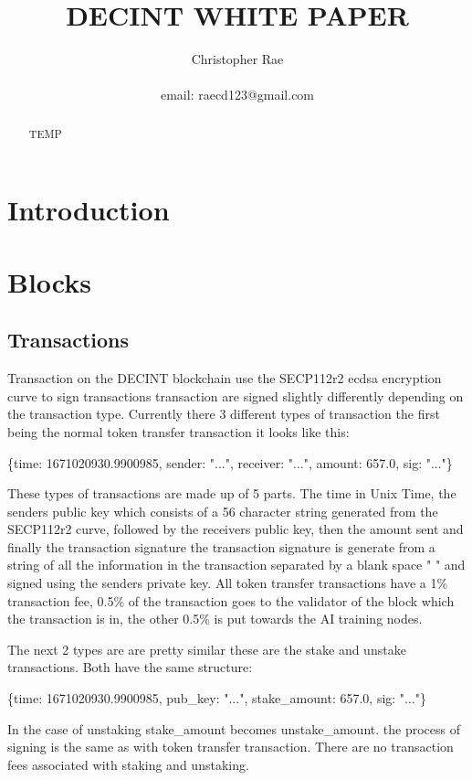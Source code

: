 \documentclass[11pt]{extarticle}
\title{DECINT WHITE PAPER}
\author{Christopher Rae \\ \begin{small} email: raecd123@gmail.com \end{small}}
\date{}
\begin{document}
\maketitle

\begin{abstract}
TEMP
\end{abstract}

\section{Introduction}

\section{Blocks} 
\subsection{Transactions}
Transaction on the DECINT blockchain use the SECP112r2 ecdsa encryption curve to sign transactions transaction are signed slightly differently depending on the transaction type. Currently there 3 different types of transaction the first being the normal token transfer transaction it looks like this:
\
\begin{center}
\{time: 1671020930.9900985,  sender: "...",  receiver: "...",  amount: 657.0,  sig: "..."\}
\end{center}

These types of transactions are made up of 5 parts. The time in Unix Time, the senders public key which consists of a 56 character string generated from the SECP112r2 curve, followed by the receivers public key, then the amount sent and finally the transaction signature the transaction signature is generate from a string of all the information in the transaction separated by a blank space " " and signed using the senders private key. All token transfer transactions have a 1\% transaction fee, 0.5\% of the transaction goes to the validator of the block which the transaction is in, the other 0.5\% is put towards the AI training nodes.  

The next 2 types are are pretty similar these are the stake and unstake transactions. Both have the same structure:
\
\begin{center}
\{time: 1671020930.9900985,  pub\_key: "...",  stake\_amount: 657.0,  sig: "..."\}
\end{center}

In the case of unstaking stake\_amount becomes unstake\_amount. the process of signing is the same as with token transfer transaction. There are no transaction fees associated with staking and unstaking.
\end{document}
